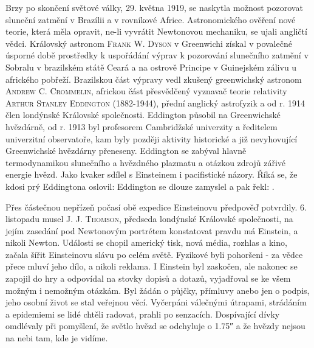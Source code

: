        Brzy po skončení světové války, 29. května 1919, se naskytla možnost pozorovat sluneční
        zatmění v Brazílii a v rovníkové Africe. Astronomického ověření nové teorie, která měla
        opravit, ne-li vyvrátit Newtonovou mechaniku, se ujali angličtí vědci. Královský astronom
        \textsc{Frank W. Dyson} v Greenwichi získal v povalečné úsporné době prostředky k uspořádání
        výprav k pozorování slunečního zatmění v Sobralu v brazilském státě Ceará a na ostrově
        Principe v Guinejském zálivu u afrického pobřeží. Brazilskou část výpravy vedl zkušený
        greenwichský astronom \textsc{Andrew C. Crommelin}, africkou část přesvědčený vyznavač
        teorie relativity \textsc{Arthur Stanley Eddington} (1882-1944), přední anglický astrofyzik
        a od r. 1914 člen londýnské Královské společnosti. Eddington působil na Greenwichské
        hvězdárně, od r. 1913 byl profesorem Cambridžské univerzity a ředitelem univerzitní
        observatoře, kam byly později aktivity historické a již nevyhovující Greenwichské hvězdárny
        přeneseny. Eddington se zabýval hlavně termodynamikou slunečního a hvězdného plazmatu a
        otázkou zdrojů zářivé energie hvězd. Jako kvaker sdílel s Einsteinem i pacifistické názory.
        Říká se, že kdosi prý Eddingtona oslovil: \emph{} Eddington se dlouze zamyslel a pak řekl:
        \emph{}.

        Přes částečnou nepřízeň počasí obě expedice Einsteinovu předpověď potvrdily. 6. listopadu
        musel \textsc{J. J. Thomson}, předseda londýnské Královské společnosti, na jejím zasedání
        pod Newtonovým portrétem konstatovat pravdu má Einstein, a nikoli Newton. Události se chopil
        americký tisk, nová média, rozhlas a kino, začala šířit Einsteinovu slávu po celém světě.
        Fyzikové byli pohoršeni - za vědce přece mluví jeho dílo, a nikoli reklama. I Einstein byl
        zaskočen, ale nakonec se zapojil do hry a odpovídal na stovky dopisů a dotazů, vyjadřoval se
        ke všem možným i nemožným otázkám. Byl žádán o půjčky, přímluvy anebo jen o podpis, jeho
        osobní život se stal veřejnou věcí. Vyčerpáni válečnými útrapami, strádáním a epidemiemi se
        lidé chtěli radovat, prahli po senzacích. Dospívající dívky omdlévaly při pomyšlení, že
        světlo hvězd se odchyluje o \ang{;;1.75} a že hvězdy nejsou na nebi tam, kde je vidíme.

